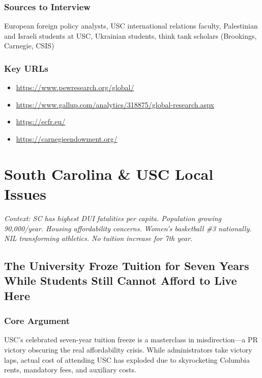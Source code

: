 \documentclass[11pt,letterpaper]{article}
\begin{document}
\subsubsection*{Sources to Interview}
European foreign policy analysts, USC international relations faculty, Palestinian and Israeli students at USC, Ukrainian students, think tank scholars (Brookings, Carnegie, CSIS)

\subsubsection*{Key URLs}
\begin{itemize}[noitemsep]
    \item \url{https://www.pewresearch.org/global/}
    \item \url{https://www.gallup.com/analytics/318875/global-research.aspx}
    \item \url{https://ecfr.eu/}
    \item \url{https://carnegieendowment.org/}
\end{itemize}

\newpage
\section{South Carolina \& USC Local Issues}

\textit{Context: SC has highest DUI fatalities per capita. Population growing 90,000/year. Housing affordability concerns. Women's basketball \#3 nationally. NIL transforming athletics. No tuition increase for 7th year.}

\newpage
\subsection{The University Froze Tuition for Seven Years While Students Still Cannot Afford to Live Here}

\subsubsection*{Core Argument}
USC's celebrated seven-year tuition freeze is a masterclass in misdirection---a PR victory obscuring the real affordability crisis. While administrators take victory laps, actual cost of attending USC has exploded due to skyrocketing Columbia rents, mandatory fees, and auxiliary costs.
\end{document}
